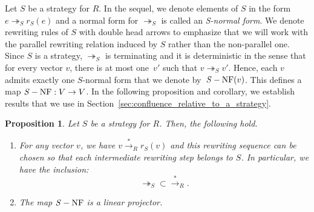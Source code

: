 \documentclass[11pt]{article}
\newtheorem{proposition}[theorem]{Proposition}
\theoremstyle{definition}
\newcommand\parS{\twoheadrightarrow_S}
\newcommand\transR{\overset{*}{\to}_R}
\DeclareMathOperator{\SNF}{{\it S}-NF}
\begin{document}
Let $S$ be a strategy for $R$. In the sequel, we denote elements of $S$
in the form $e\parS r_S(e)$ and a normal form for $\parS$ is called an
{\em S-normal form}. We denote rewriting rules of $S$ with double head
arrows to emphasize that we will work with the parallel rewriting
relation induced by $S$ rather than the non-parallel one. Since $S$ is a
strategy, $\parS$ is terminating and it is deterministic in the sense
that for every vector $v$, there is at most one~$v'$ such that
$v\parS v'$. Hence, each $v$ admits exactly one $S$-normal form that we
denote by~$\SNF(v)$. This defines a map $\SNF:V\to V$. In the following
proposition and corollary, we establish results that we use in
Section~\ref{sec:confluence_relative_to_a_strategy}.
\smallskip

\begin{proposition}\label{prop:strategies}
  Let $S$ be a strategy for $R$. Then, the following hold.
  \begin{enumerate}
  \item\label{it:rewS_transR} For any vector $v$, we have
    $v \transR r_S(v)$ and this rewriting sequence can be chosen so that
    each intermediate rewriting step belongs to $S$. In particular, we
    have the inclusion:
  \[
    \parS \subset \transR.
    \]
  \item\label{it:linearity_of_SNF} The map $\SNF$ is a linear
    projector.
  \end{enumerate}
\end{proposition}
\end{document}
